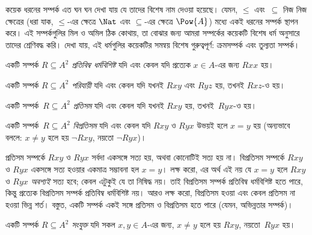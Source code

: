 \documentclass[../../../include/open-logic-section]{subfiles}
\begin{document}

\begin{intro}
কয়েক ধরনের সম্পর্ক এত ঘন ঘন দেখা যায় যে তাদের বিশেষ নাম দেওয়া হয়েছে। যেমন, $\le$ এবং~$\subseteq$ নিজ নিজ ক্ষেত্রের (ধরা যাক, $\le$-এর ক্ষেত্রে $\Nat$ এবং $\subseteq$-এর ক্ষেত্রে $\Pow{A}$) মধ্যে একই ধরনের সম্পর্ক স্থাপন করে। এই সম্পর্কগুলির মিল ও অমিল ঠিক কোথায়, তা বোঝার জন্য আমরা সম্পর্কের কয়েকটি বিশেষ ধর্ম অনুসারে তাদের শ্রেণিবদ্ধ করি। দেখা যায়, এই ধর্মগুলির কয়েকটির সমন্বয় বিশেষ গুরুত্বপূর্ণ: ক্রমসম্পর্ক এবং তুল্যতা সম্পর্ক।
\end{intro}

\begin{defn}[প্রতিবিম্ব ধর্ম]
একটি সম্পর্ক $R \subseteq A^2$ \emph{প্রতিবিম্ব ধর্মবিশিষ্ট} যদি এবং কেবল যদি প্রত্যেক $x \in A$-এর জন্য $Rxx$ হয়।
\end{defn}

\begin{defn}[পরিযায়িতা]
একটি সম্পর্ক $R \subseteq A^2$ \emph{পরিযায়ী} যদি এবং কেবল যদি যখনই $Rxy$ এবং $Ryz$ হয়, তখনই $Rxz$-ও হয়।
\end{defn}

\begin{defn}[প্রতিসাম্য]
একটি সম্পর্ক~$R \subseteq A^2$ \emph{প্রতিসম} যদি এবং কেবল যদি যখনই $Rxy$ হয়, তখনই~$Ryx$-ও হয়।
\end{defn}

\begin{defn}[বিপ্রতিসাম্য]
একটি সম্পর্ক~$R \subseteq A^2$ \emph{বিপ্রতিসম} যদি এবং কেবল যদি $Rxy$ ও $Ryx$ উভয়ই হলে $x=y$ হয় (অন্যভাবে বললে: $x\neq y$ হলে হয় $\lnot Rxy$, নয়তো $\lnot Ryx$)।
\end{defn}

\begin{explain}
প্রতিসম সম্পর্কে $Rxy$ ও $Ryx$ সর্বদা একসঙ্গে সত্য হয়, অথবা কোনোটিই সত্য হয় না। বিপ্রতিসম সম্পর্কে $Rxy$ ও $Ryx$ একসঙ্গে সত্য হওয়ার একমাত্র সম্ভাবনা হল $x = y$। লক্ষ করো, এর অর্থ এই নয় যে $x = y$ হলে $Rxy$ ও $Ryx$ \emph{অবশ্যই} সত্য হবে; কেবল এটুকুই যে তা নিষিদ্ধ নয়। তাই বিপ্রতিসম সম্পর্ক প্রতিবিম্ব ধর্মবিশিষ্ট হতে পারে, কিন্তু প্রত্যেক বিপ্রতিসম সম্পর্ক প্রতিবিম্ব ধর্মবিশিষ্ট নয়। আরও লক্ষ করো, বিপ্রতিসম হওয়া এবং কেবল প্রতিসম না হওয়া ভিন্ন শর্ত। বস্তুত, একটি সম্পর্ক একই সঙ্গে প্রতিসম ও বিপ্রতিসম হতে পারে (যেমন, অভিন্নতার সম্পর্ক)।
\end{explain}

\begin{defn}[সংযুক্ততা]
একটি সম্পর্ক $R \subseteq A^2$ \emph{সংযুক্ত} যদি সকল $x,y\in A$-এর জন্য, $x \neq y$ হলে হয় $Rxy$, নয়তো~$Ryx$ হয়।
\end{defn}
\end{document}
